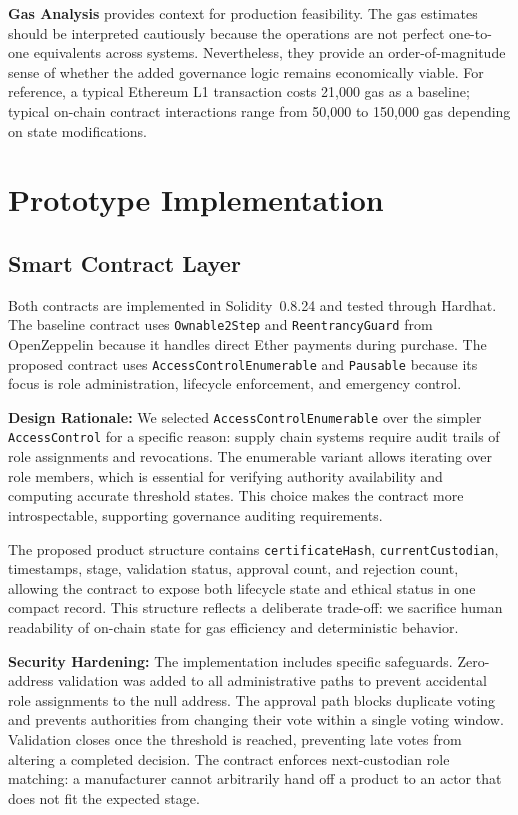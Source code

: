 \documentclass[conference]{IEEEtran}
\begin{document}
\textbf{Gas Analysis} provides context for production feasibility. The gas estimates should be interpreted cautiously because the operations are not perfect one-to-one equivalents across systems. Nevertheless, they provide an order-of-magnitude sense of whether the added governance logic remains economically viable. For reference, a typical Ethereum L1 transaction costs 21,000 gas as a baseline; typical on-chain contract interactions range from 50,000 to 150,000 gas depending on state modifications.

\section{Prototype Implementation}

\subsection{Smart Contract Layer}

Both contracts are implemented in Solidity~0.8.24 and tested through Hardhat. The baseline contract uses \texttt{Ownable2Step} and \texttt{ReentrancyGuard} from OpenZeppelin because it handles direct Ether payments during purchase. The proposed contract uses \texttt{AccessControlEnumerable} and \texttt{Pausable} because its focus is role administration, lifecycle enforcement, and emergency control.

\textbf{Design Rationale:} We selected \texttt{AccessControlEnumerable} over the simpler \texttt{AccessControl} for a specific reason: supply chain systems require audit trails of role assignments and revocations. The enumerable variant allows iterating over role members, which is essential for verifying authority availability and computing accurate threshold states. This choice makes the contract more introspectable, supporting governance auditing requirements.

The proposed product structure contains \texttt{certificateHash}, \texttt{currentCustodian}, timestamps, stage, validation status, approval count, and rejection count, allowing the contract to expose both lifecycle state and ethical status in one compact record. This structure reflects a deliberate trade-off: we sacrifice human readability of on-chain state for gas efficiency and deterministic behavior.

\textbf{Security Hardening:} The implementation includes specific safeguards. Zero-address validation was added to all administrative paths to prevent accidental role assignments to the null address. The approval path blocks duplicate voting and prevents authorities from changing their vote within a single voting window. Validation closes once the threshold is reached, preventing late votes from altering a completed decision. The contract enforces next-custodian role matching: a manufacturer cannot arbitrarily hand off a product to an actor that does not fit the expected stage.
\end{document}
